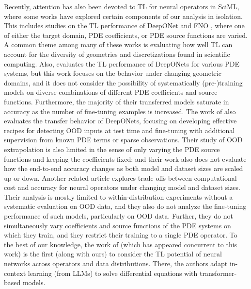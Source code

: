 Recently, attention has also been devoted to TL for neural operators in SciML, where some works have explored certain components of our analysis in isolation. 
This includes studies on the TL performance of DeepONet \cite{xu2022transfer, goswami2022deep, zhu2022reliable} and FNO \cite{li2021physics, de2022cost}, where one of either the target domain, PDE coefficients, or PDE source functions are varied. 
A common theme among many of these works is evaluating how well TL can account for the diversity of geometries \cite{chakraborty2022domain,wang2022mosaic,xu2023transfer,goswami2022deep} and discretizations \cite{lyu2023multi,chakraborty2021transfer,song2022transfer,subel2023explaining} found in scientific computing.
Also, \cite{goswami2022deep} evaluates the TL performance of DeepONets for various PDE systems, but this work focuses on the behavior under changing geometric domains, and it does not consider the possibility of systematically (pre-)training models on diverse combinations of different PDE coefficients and source functions. 
Furthermore, the majority of their transferred models saturate in accuracy as the number of fine-tuning examples is increased.
The work of \cite{zhu2022reliable} also evaluates the transfer behavior of DeepONets, focusing on developing effective recipes for detecting OOD inputs at test time and fine-tuning with additional supervision from known PDE terms or sparse observations. 
Their study of OOD extrapolation is also limited in the sense of only varying the PDE source functions and keeping the coefficients fixed; and their work also does not evaluate how the end-to-end accuracy changes as both model and dataset sizes are scaled up or down. 
Another related article \cite{de2022cost} explores trade-offs between computational cost and accuracy for neural operators under changing model and dataset sizes.
Their analysis is mostly limited to within-distribution experiments without a systematic evaluation on OOD data, and they also do not analyze the fine-tuning performance of such models, particularly on OOD data. 
Further, they do not simultaneously vary coefficients and source functions of the PDE systems on which they train, and they restrict their training to a single PDE operator.
To the best of our knowledge, the work of \cite{yang2023context} (which has appeared concurrent to this work) is the first (along with ours) to consider the TL potential of neural networks across operators and data distributions.
There, the authors adapt in-context learning (from LLMs) to solve differential equations with transformer-based models.
